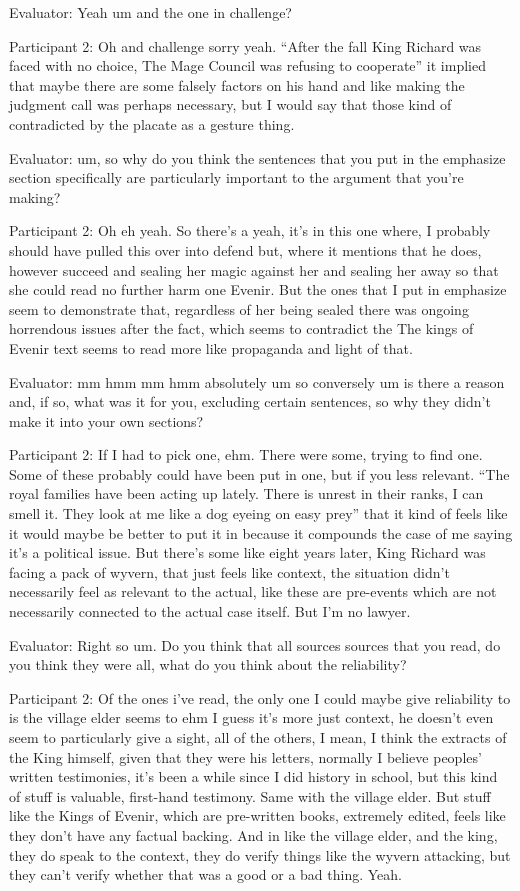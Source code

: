 \documentclass{l4proj}
\begin{document}
\begin{appendices}
Evaluator: Yeah um and the one in challenge?

Participant 2: Oh and challenge sorry yeah. “After the fall King Richard was faced with no choice, The Mage Council was refusing to cooperate” it implied that maybe there are some falsely factors on his hand and like making the judgment call was perhaps necessary, but I would say that those kind of contradicted by the placate as a gesture thing.
 

Evaluator: um, so why do you think the sentences that you put in the emphasize section specifically are particularly important to the argument that you're making?

Participant 2: Oh eh yeah. So there's a yeah, it's in this one where, I probably should have pulled this over into defend but, where it mentions that he does, however succeed and sealing her magic against her and sealing her away so that she could read no further harm one Evenir. But the ones that I put in emphasize seem to demonstrate that, regardless of her being sealed there was ongoing horrendous issues after the fact, which seems to contradict the The kings of Evenir text seems to read more like propaganda and light of that.

 

Evaluator: mm hmm mm hmm absolutely um so conversely um is there a reason and, if so, what was it for you, excluding certain sentences, so why they didn't make it into your own sections?

Participant 2: If I had to pick one, ehm. There were some, trying to find one. Some of these probably could have been put in one, but if you less relevant. “The royal families have been acting up lately. There is unrest in their ranks, I can smell it. They look at me like a dog eyeing on easy prey” that it kind of feels like it would maybe be better to put it in because it compounds the case of me saying it’s a political issue. But there’s some like eight years later, King Richard was facing a pack of wyvern, that just feels like context, the situation didn’t necessarily feel as relevant to the actual, like these are pre-events which are not necessarily connected to the actual case itself. But I’m no lawyer. 

Evaluator: Right so um. Do you think that all sources sources that you read, do you think they were all, what do you think about the reliability?

Participant 2: Of the ones i've read, the only one I could maybe give reliability to  is the village elder seems to ehm I guess it's more just context, he doesn’t even seem to particularly give a sight, all of the others, I mean, I think the extracts of the King himself, given that they were his letters, normally I believe peoples’ written testimonies, it’s been a while since I did history in school, but this kind of stuff is valuable, first-hand testimony. Same with the village elder. But stuff like the Kings of Evenir, which are pre-written books, extremely edited, feels like they don’t have any factual backing. And in like the village elder, and the king, they do speak to the context, they do verify things like the wyvern attacking, but they can’t verify whether that was a good or a bad thing. Yeah. 


\end{appendices}
\end{document}
